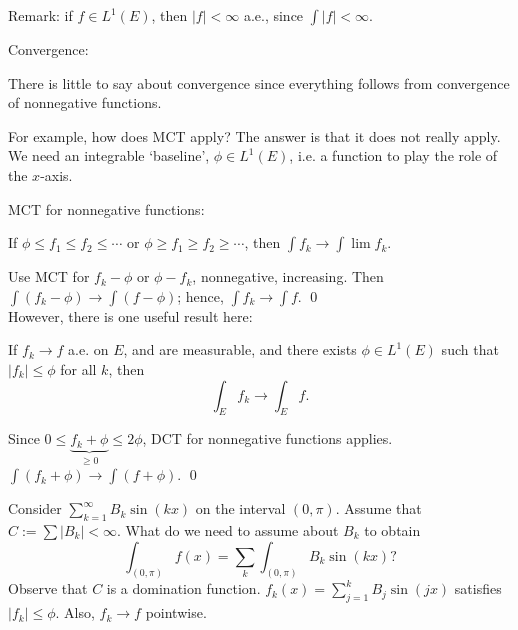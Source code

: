 Remark: if $f \in L^1(E)$, then $|f|<\infty$ a.e., since $\int |f|<\infty$. 




Convergence: 

There is little to say about convergence since everything follows from convergence of nonnegative functions. 


For example, how does MCT apply? The answer is that it does not really apply. We need an integrable `baseline', $\phi \in L^1(E)$, i.e. a function to play the role of the $x$-axis. 

MCT for nonnegative functions: 


If $\phi \leq f_1 \leq f_2 \leq \cdots$ or $\phi \geq f_1 \geq f_2 \geq \cdots$, then $\int f_k \to \int \lim f_k$. 

\pf Use MCT for $f_k - \phi$ or $\phi - f_k$, nonnegative, increasing. Then $\int (f_k - \phi) \to \int (f-\phi)$; hence, $\int f_k \to \int f$. \qed \\



However, there is one useful result here:

\begin{thm}
If $f_k \to f$ a.e. on $E$, and are measurable, and there exists $\phi \in L^1(E)$ such that $|f_k| \leq \phi$ for all $k$, then
	\[
	\int_E f_k \longrightarrow \int_E f.
	\]
\end{thm}


\pf Since $0 \leq \underbrace{f_k+\phi}_{\geq 0} \leq 2 \phi$, DCT for nonnegative functions applies. $\int (f_k+\phi) \to \int (f+\phi)$. \qed \\


\begin{ex}
Consider $\sum_{k=1}^\infty B_k \sin(kx)$ on the interval $(0,\pi)$. Assume that $C:=\sum |B_k|<\infty$. What do we need to assume about $B_k$ to obtain
	\[
	\int_{(0,\pi)} f(x) = \sum_k \int_{(0,\pi)} B_k \sin(kx)?
	\] 
Observe that $C$ is a domination function. $f_k(x) = \sum_{j=1}^k B_j \sin(jx)$ satisfies $|f_k| \leq \phi$. Also, $f_k \to f$ pointwise. 

\end{ex}













